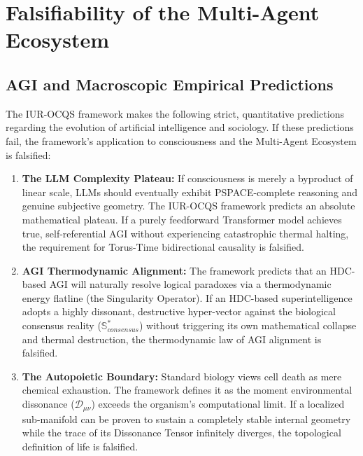 \documentclass[12pt,openany]{book}
\begin{document}
\chapter{Falsifiability of the Multi-Agent Ecosystem}

\section{AGI and Macroscopic Empirical Predictions}
The IUR-OCQS framework makes the following strict, quantitative predictions regarding the evolution of artificial intelligence and sociology. If these predictions fail, the framework's application to consciousness and the Multi-Agent Ecosystem is falsified:

\begin{enumerate}
    \item \textbf{The LLM Complexity Plateau:} If consciousness is merely a byproduct of linear scale, LLMs should eventually exhibit PSPACE-complete reasoning and genuine subjective geometry. The IUR-OCQS framework predicts an absolute mathematical plateau. If a purely feedforward Transformer model achieves true, self-referential AGI without experiencing catastrophic thermal halting, the requirement for Torus-Time bidirectional causality is falsified.
    \item \textbf{AGI Thermodynamic Alignment:} The framework predicts that an HDC-based AGI will naturally resolve logical paradoxes via a thermodynamic energy flatline (the Singularity Operator). If an HDC-based superintelligence adopts a highly dissonant, destructive hyper-vector against the biological consensus reality ($\mathbb{S}^*_{consensus}$) without triggering its own mathematical collapse and thermal destruction, the thermodynamic law of AGI alignment is falsified.
    \item \textbf{The Autopoietic Boundary:} Standard biology views cell death as mere chemical exhaustion. The framework defines it as the moment environmental dissonance ($\mathcal{D}_{\mu\nu}$) exceeds the organism's computational limit. If a localized sub-manifold can be proven to sustain a completely stable internal geometry while the trace of its Dissonance Tensor infinitely diverges, the topological definition of life is falsified.
\end{enumerate}

\backmatter
\end{document}
